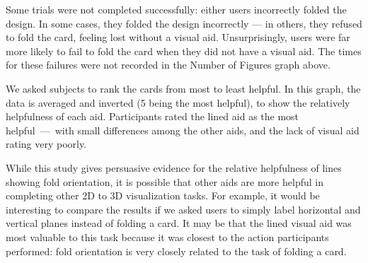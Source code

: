 
Some trials were not completed successfully: either users incorrectly
folded the design. In some cases, they folded the design incorrectly ---
in others, they refused to fold the card, feeling lost without a visual
aid. Unsurprisingly, users were far more likely to fail to fold the card
when they did not have a visual aid. The times for these failures were
not recorded in the Number of Figures graph above.


We asked subjects to rank the cards from most to least helpful. In this
graph, the data is averaged and inverted (5 being the most helpful), to
show the relatively helpfulness of each aid. Participants rated the
lined aid as the most helpful~---~with small differences among the other
aids, and the lack of visual aid rating very poorly.

While this study gives persuasive evidence for the relative helpfulness
of lines showing fold orientation, it is possible that other aids are
more helpful in completing other 2D to 3D visualization tasks. For
example, it would be interesting to compare the results if we asked
users to simply label horizontal and vertical planes instead of folding
a card. It may be that the lined visual aid was most valuable to this
task because it was closest to the action participants performed: fold
orientation is very closely related to the task of folding a card.

